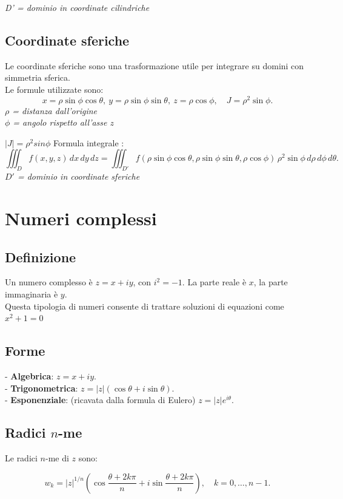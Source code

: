 \documentclass[a4paper,12pt]{article}
\begin{document}
\textit{D' = dominio in coordinate cilindriche}

\subsection{Coordinate sferiche}

Le coordinate sferiche sono una trasformazione utile per integrare su domini con simmetria sferica.\\
Le formule utilizzate sono: 
\[
x=\rho\sin\phi\cos\theta,\ y=\rho\sin\phi\sin\theta,\ z=\rho\cos\phi,\quad J=\rho^2\sin\phi.
\]
\textit{$\rho$ = distanza dall'origine}\\
\textit{$\phi$ = angolo rispetto all'asse $z$}

$|J| = \rho^2sin\phi$
Formula integrale :
\[
\iiint_D f(x,y,z)\,dx\,dy\,dz=\iiint_{D'} f(\rho\sin\phi\cos\theta,\rho\sin\phi\sin\theta,\rho\cos\phi)\,\rho^2\sin\phi\,d\rho\,d\phi\,d\theta.
\]
\textit{$D'$ = dominio in coordinate sferiche}


\section{Numeri complessi}

\subsection{Definizione}
Un numero complesso è $z=x+iy$, con $i^2=-1$.  
La parte reale è $x$, la parte immaginaria è $y$.\\
Questa tipologia di numeri consente di trattare soluzioni di equazioni come $x^2+1=0$

\subsection{Forme}
- \textbf{  Algebrica}: $z=x+iy$. \\ 
- \textbf{Trigonometrica}: $z=|z|(\cos\theta+i\sin\theta)$.\\
- \textbf{ Esponenziale}: (ricavata dalla formula di Eulero) $z=|z|e^{i\theta}$.

\subsection{Radici $n$-me}
Le radici $n$-me di $z$ sono:


\[
w_k=|z|^{1/n}\left(\cos\frac{\theta+2k\pi}{n}+i\sin\frac{\theta+2k\pi}{n}\right),\quad k=0,\dots,n-1.
\]
\end{document}
